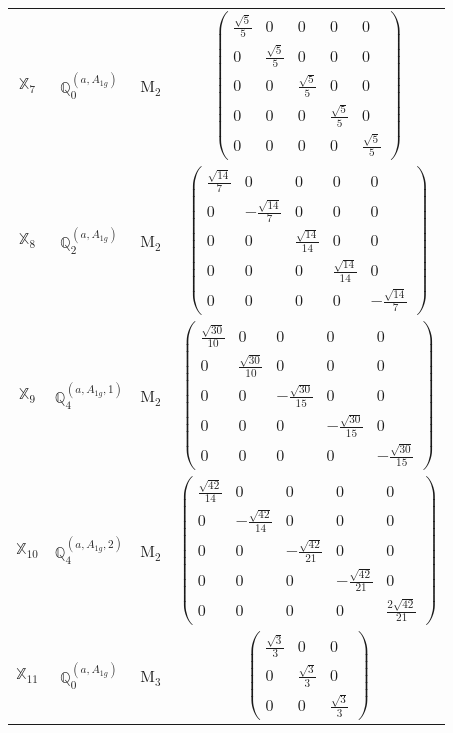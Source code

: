 \documentclass[fleqn,10pt,landscape]{article}
\begin{document}
\begin{itemize}
\begin{center}
\begin{longtable}{c|c|c|c}
$ \mathbb{X}_{7} $ & $\mathbb{Q}_{0}^{(a,A_{1g})}$ & M$_{2}$ & $\begin{pmatrix} \frac{\sqrt{5}}{5} & 0 & 0 & 0 & 0 \\ 0 & \frac{\sqrt{5}}{5} & 0 & 0 & 0 \\ 0 & 0 & \frac{\sqrt{5}}{5} & 0 & 0 \\ 0 & 0 & 0 & \frac{\sqrt{5}}{5} & 0 \\ 0 & 0 & 0 & 0 & \frac{\sqrt{5}}{5} \end{pmatrix}$ \\
$ \mathbb{X}_{8} $ & $\mathbb{Q}_{2}^{(a,A_{1g})}$ & M$_{2}$ & $\begin{pmatrix} \frac{\sqrt{14}}{7} & 0 & 0 & 0 & 0 \\ 0 & - \frac{\sqrt{14}}{7} & 0 & 0 & 0 \\ 0 & 0 & \frac{\sqrt{14}}{14} & 0 & 0 \\ 0 & 0 & 0 & \frac{\sqrt{14}}{14} & 0 \\ 0 & 0 & 0 & 0 & - \frac{\sqrt{14}}{7} \end{pmatrix}$ \\
$ \mathbb{X}_{9} $ & $\mathbb{Q}_{4}^{(a,A_{1g},1)}$ & M$_{2}$ & $\begin{pmatrix} \frac{\sqrt{30}}{10} & 0 & 0 & 0 & 0 \\ 0 & \frac{\sqrt{30}}{10} & 0 & 0 & 0 \\ 0 & 0 & - \frac{\sqrt{30}}{15} & 0 & 0 \\ 0 & 0 & 0 & - \frac{\sqrt{30}}{15} & 0 \\ 0 & 0 & 0 & 0 & - \frac{\sqrt{30}}{15} \end{pmatrix}$ \\
$ \mathbb{X}_{10} $ & $\mathbb{Q}_{4}^{(a,A_{1g},2)}$ & M$_{2}$ & $\begin{pmatrix} \frac{\sqrt{42}}{14} & 0 & 0 & 0 & 0 \\ 0 & - \frac{\sqrt{42}}{14} & 0 & 0 & 0 \\ 0 & 0 & - \frac{\sqrt{42}}{21} & 0 & 0 \\ 0 & 0 & 0 & - \frac{\sqrt{42}}{21} & 0 \\ 0 & 0 & 0 & 0 & \frac{2 \sqrt{42}}{21} \end{pmatrix}$ \\ \hline
$ \mathbb{X}_{11} $ & $\mathbb{Q}_{0}^{(a,A_{1g})}$ & M$_{3}$ & $\begin{pmatrix} \frac{\sqrt{3}}{3} & 0 & 0 \\ 0 & \frac{\sqrt{3}}{3} & 0 \\ 0 & 0 & \frac{\sqrt{3}}{3} \end{pmatrix}$ \\

\end{longtable}
\end{center}
\end{itemize}
\end{document}
